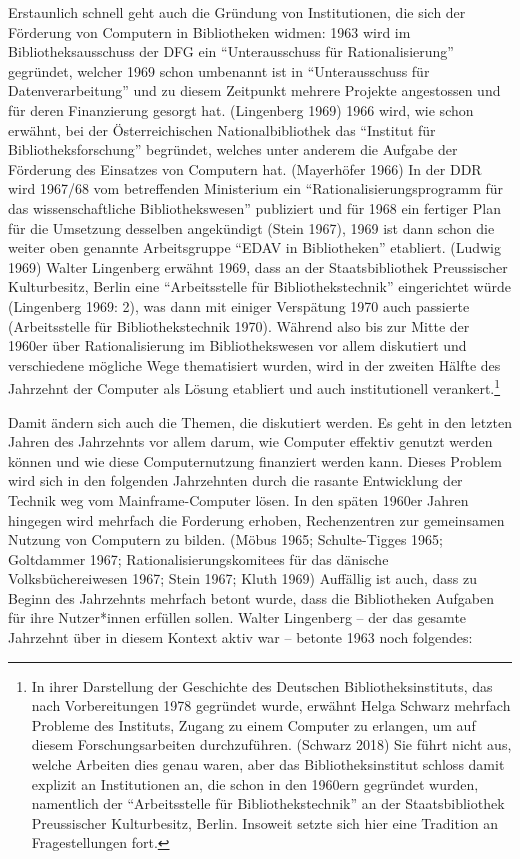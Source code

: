 \documentclass[a4paper,
fontsize=11pt,
oneside,
numbers=noperiodatend,
parskip=half-,
bibliography=totoc,
final
]{scrartcl}
\begin{document}
Erstaunlich schnell geht auch die Gründung von Institutionen, die sich
der Förderung von Computern in Bibliotheken widmen: 1963 wird im
Bibliotheksausschuss der DFG ein \enquote{Unterausschuss für Rationalisierung}
gegründet, welcher 1969 schon umbenannt ist in \enquote{Unterausschuss für
Datenverarbeitung} und zu diesem Zeitpunkt mehrere Projekte angestossen
und für deren Finanzierung gesorgt hat. (Lingenberg 1969) 1966 wird, wie
schon erwähnt, bei der Österreichischen Nationalbibliothek das \enquote{Institut
für Bibliotheksforschung} begründet, welches unter anderem die Aufgabe
der Förderung des Einsatzes von Computern hat. (Mayerhöfer 1966) In der
DDR wird 1967/68 vom betreffenden Ministerium ein
\enquote{Rationalisierungsprogramm für das wissenschaftliche Bibliothekswesen}
publiziert und für 1968 ein fertiger Plan für die Umsetzung desselben
angekündigt (Stein 1967), 1969 ist dann schon die weiter oben genannte
Arbeitsgruppe \enquote{EDAV in Bibliotheken} etabliert. (Ludwig 1969) Walter
Lingenberg erwähnt 1969, dass an der Staatsbibliothek Preussischer
Kulturbesitz, Berlin eine \enquote{Arbeitsstelle für Bibliothekstechnik}
eingerichtet würde (Lingenberg 1969: 2), was dann mit einiger Verspätung
1970 auch passierte (Arbeitsstelle für Bibliothekstechnik 1970). Während
also bis zur Mitte der 1960er über Rationalisierung im Bibliothekswesen
vor allem diskutiert und verschiedene mögliche Wege thematisiert wurden,
wird in der zweiten Hälfte des Jahrzehnt der Computer als Lösung
etabliert und auch institutionell verankert.\footnote{In ihrer
  Darstellung der Geschichte des Deutschen Bibliotheksinstituts, das
  nach Vorbereitungen 1978 gegründet wurde, erwähnt Helga Schwarz
  mehrfach Probleme des Instituts, Zugang zu einem Computer zu erlangen,
  um auf diesem Forschungsarbeiten durchzuführen. (Schwarz 2018) Sie
  führt nicht aus, welche Arbeiten dies genau waren, aber das
  Bibliotheksinstitut schloss damit explizit an Institutionen an, die
  schon in den 1960ern gegründet wurden, namentlich der \enquote{Arbeitsstelle
  für Bibliothekstechnik} an der Staatsbibliothek Preussischer
  Kulturbesitz, Berlin. Insoweit setzte sich hier eine Tradition an
  Fragestellungen fort.}

Damit ändern sich auch die Themen, die diskutiert werden. Es geht in den
letzten Jahren des Jahrzehnts vor allem darum, wie Computer effektiv
genutzt werden können und wie diese Computernutzung finanziert werden
kann. Dieses Problem wird sich in den folgenden Jahrzehnten durch die
rasante Entwicklung der Technik weg vom Mainframe-Computer lösen. In den
späten 1960er Jahren hingegen wird mehrfach die Forderung erhoben,
Rechenzentren zur gemeinsamen Nutzung von Computern zu bilden. (Möbus
1965; Schulte-Tigges 1965; Goltdammer 1967; Rationalisierungskomitees
für das dänische Volksbüchereiwesen 1967; Stein 1967; Kluth 1969)
Auffällig ist auch, dass zu Beginn des Jahrzehnts mehrfach betont wurde,
dass die Bibliotheken Aufgaben für ihre Nutzer*innen erfüllen sollen.
Walter Lingenberg -- der das gesamte Jahrzehnt über in diesem Kontext
aktiv war -- betonte 1963 noch folgendes:
\end{document}
